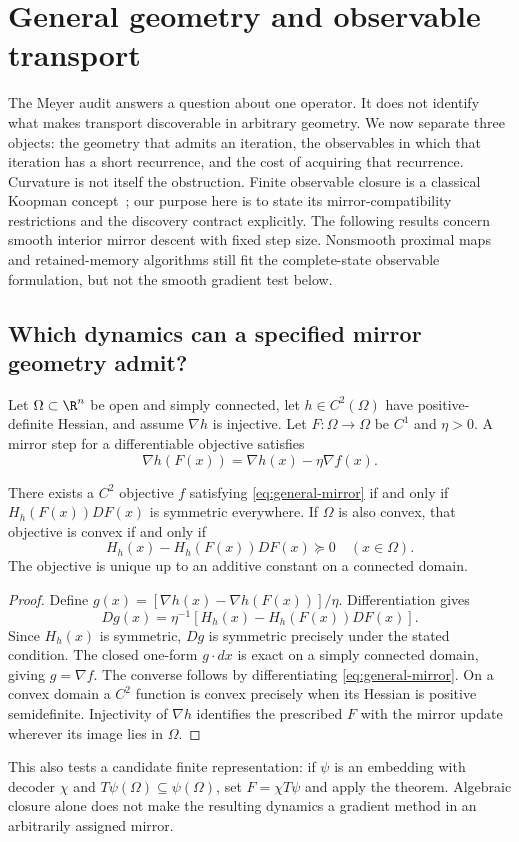 \section{General geometry and observable transport}
\label{sec:general-geometry}
The Meyer audit answers a question about one operator. It does not identify
what makes transport discoverable in arbitrary geometry. We now separate
three objects: the geometry that admits an iteration, the observables in
which that iteration has a short recurrence, and the cost of acquiring that
recurrence. Curvature is not itself the obstruction. Finite observable closure
is a classical Koopman concept~\cite{brunton,ssd}; our purpose here is to state
its mirror-compatibility restrictions and the discovery contract explicitly.
The following results concern smooth interior mirror descent with fixed step
size. Nonsmooth proximal maps and retained-memory algorithms still fit the
complete-state observable formulation, but not the smooth gradient test below.

\subsection{Which dynamics can a specified mirror geometry admit?}
Let $\Omega\subset\R^n$ be open and simply connected, let $h\in C^2(\Omega)$
have positive-definite Hessian, and assume $\nabla h$ is injective. Let
$F:\Omega\to\Omega$ be $C^1$ and $\eta>0$. A mirror step for a differentiable
objective satisfies
\begin{equation}
 \nabla h(F(x))=\nabla h(x)-\eta\nabla f(x).
 \label{eq:general-mirror}
\end{equation}
\begin{theorem}
There exists a $C^2$ objective $f$ satisfying \eqref{eq:general-mirror} if and
only if $H_h(F(x))DF(x)$ is symmetric everywhere. If $\Omega$ is also convex,
that objective is convex if and only if
\begin{equation}
 H_h(x)-H_h(F(x))DF(x)\succeq0 \quad(x\in\Omega).
 \label{eq:general-convexity}
\end{equation}
The objective is unique up to an additive constant on a connected domain.
\end{theorem}
\begin{proof}
Define $g(x)=[\nabla h(x)-\nabla h(F(x))]/\eta$. Differentiation gives
\[ Dg(x)=\eta^{-1}[H_h(x)-H_h(F(x))DF(x)]. \]
Since $H_h(x)$ is symmetric,
$Dg$ is symmetric precisely under the stated condition. The closed one-form
$g\cdot dx$ is exact on a simply connected domain, giving $g=\nabla f$.
The converse follows by differentiating \eqref{eq:general-mirror}.
On a convex domain a $C^2$ function is convex precisely when its Hessian is
positive semidefinite. Injectivity of $\nabla h$ identifies the prescribed
$F$ with the mirror update wherever its image lies in $\Omega$.
\end{proof}
This also tests a candidate finite representation: if $\psi$ is an embedding
with decoder $\chi$ and $T\psi(\Omega)\subseteq\psi(\Omega)$, set
$F=\chi T\psi$ and apply the theorem. Algebraic closure alone does not make
the resulting dynamics a gradient method in an arbitrarily assigned mirror.

